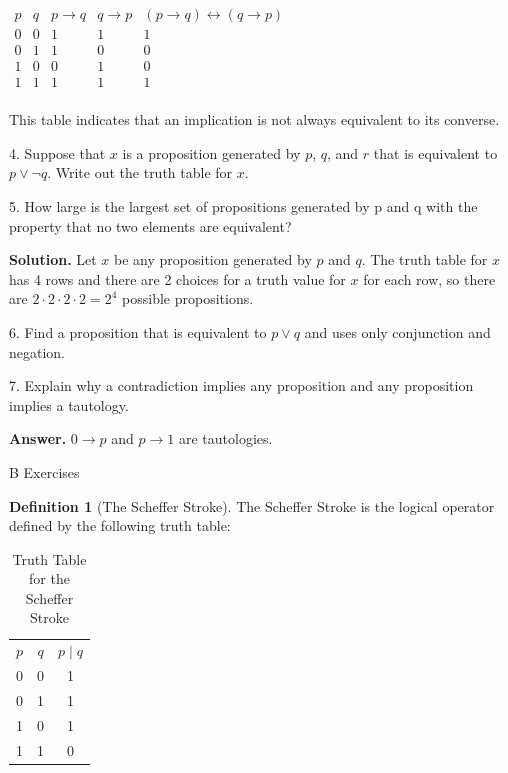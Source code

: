 \documentclass[10pt,]{book}
\theoremstyle{plain}
\theoremstyle{definition}
\newtheorem{definition}[theorem]{Definition}
\theoremstyle{definition}
\theoremstyle{definition}
\theoremstyle{definition}
\begin{document}
\begin{exercisegroup}
\(\begin{array}{ccccc}
 p & q  & p\to q  & q\to p  & (p\to q)\leftrightarrow (q\to p) \\
\hline
 0 & 0 & 1 & 1 & 1\\
 0 & 1 & 1 & 0 & 0\\
 1 & 0 & 0 & 1 & 0 \\
 1 & 1 & 1 & 1 & 1 \\

\end{array}\)%
\par

This table indicates that an implication is not always equivalent to its converse. %
\item[4.]\hypertarget{exercise-15}{}Suppose that \(x\) is a proposition generated by \(p\), \(q\), and \(r\) that is equivalent to \(p \lor  \neg q\). Write out the truth table for \(x\).%
\par\smallskip
\item[5.]\hypertarget{exercise-16}{}
How large is the largest set of propositions generated by p and q with the property that no two elements are equivalent?
%
\par\smallskip
\par\smallskip
\noindent\textbf{Solution.}\hypertarget{solution-2}{}\quad
Let \(x\) be any proposition generated by \(p\) and \(q\). The truth table for \(x\) has 4 rows and there are 2 choices for a truth value for \(x\) for each row, so there are \(2\cdot 2\cdot 2\cdot 2=2^4\) possible propositions.%
\item[6.]\hypertarget{exercise-17}{}Find a proposition that is equivalent to \(p \lor  q\) and uses only conjunction and negation.

%
\par\smallskip
\item[7.]\hypertarget{exercise-18}{}Explain why a contradiction implies any proposition and any proposition implies a tautology.
%
\par\smallskip
\par\smallskip
\noindent\textbf{Answer.}\hypertarget{answer-8}{}\quad
 \(0\to p\) and \(p\to 1\) are tautologies.%
\end{exercisegroup}
\par\smallskip\noindent
\hypertarget{exercisegroup-4}{}\typeout{************************************************}
\typeout{************************************************}
B Exercises%
\begin{definition}[The Scheffer Stroke]\label{def-scheffer}
\label{notation-10}
The Scheffer Stroke is the logical operator defined by the following truth table:%
\leavevmode%
\begin{table}
\centering
\begin{tabular}{ccc}
\(p\) & \(q\) & \(p \mid q\) \tabularnewline[0pt]
 0 & 0 & 1 \tabularnewline[0pt]
 0 & 1 & 1 \tabularnewline[0pt]
 1 & 0 & 1 \tabularnewline[0pt]
 1 & 1 & 0 
\end{tabular}
\caption{Truth Table for the Scheffer Stroke\label{tt-scheffer}}
\end{table}
\end{definition}
\end{document}
